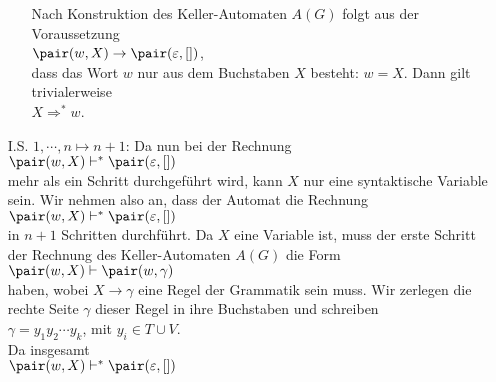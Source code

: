 \begin{enumerate}
\begin{enumerate}
                  Nach Konstruktion des Keller-Automaten $A(G)$ folgt aus
                  der Voraussetzung
                  \\[0.2cm]
                  \hspace*{1.3cm}
                  $\pair(w,X) \rightarrow \pair(\varepsilon,[])$,
                  \\[0.2cm]
                  dass das Wort $w$ nur aus dem Buchstaben $X$ besteht: $w = X$.  Dann
                  gilt trivialerweise
                  \\[0.2cm]
                  \hspace*{1.3cm}
                  $X \Rightarrow^* w$.
            \end{enumerate}
\item[I.S.] $1,\cdots, n \mapsto n+1$:  Da nun bei der Rechnung 
            \\[0.2cm]
            \hspace*{1.3cm}
            $\pair(w,X) \vdash^* \pair(\varepsilon,[])$
            \\[0.2cm]
            mehr als ein Schritt durchgef\"uhrt wird, kann $X$ nur eine syntaktische Variable sein.            
            Wir nehmen also an, dass der Automat die Rechnung
            \\[0.2cm]
            \hspace*{1.3cm}
            $\pair(w,X) \vdash^* \pair(\varepsilon,[])$
            \\[0.2cm]
            in $n+1$ Schritten durchf\"uhrt.  Da $X$ eine Variable ist,
            muss der erste Schritt der Rechnung des Keller-Automaten $A(G)$ die Form
            \\[0.2cm]
            \hspace*{1.3cm}
            $\pair(w,X) \vdash \pair(w,\gamma)$
            \\[0.2cm]
            haben, wobei $X \rightarrow \gamma$ eine Regel der Grammatik sein muss.  Wir
            zerlegen die rechte Seite $\gamma$ dieser Regel in ihre Buchstaben und schreiben
            \\[0.2cm]
            \hspace*{1.3cm}
            $\gamma = y_1 y_2 \cdots y_k$, \quad mit $y_i \in T \cup V$.
            \\[0.2cm]
            Da insgesamt 
            \\[0.2cm]
            \hspace*{1.3cm}
            $\pair(w,X) \vdash^* \pair(\varepsilon, [])$ 
            \\[0.2cm]

\end{enumerate}
